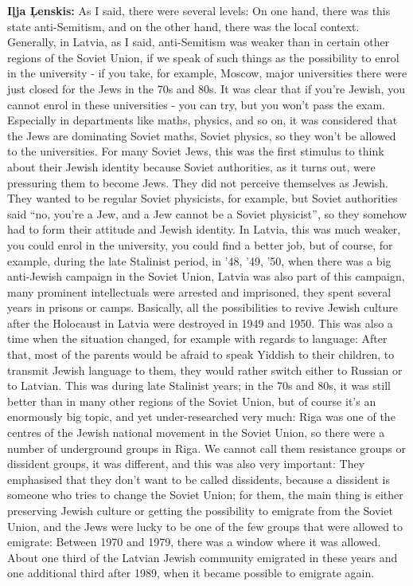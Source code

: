 \textbf{Iļja Ļenskis:} As I said, there were several levels: On one hand, there was this state anti-Semitism, and on the other hand, there was the local context. Generally, in Latvia, as I said, anti-Semitism was weaker than in certain other regions of the Soviet Union, if we speak of such things as the possibility to enrol in the university - if you take, for example, Moscow, major universities there were just closed for the Jews in the 70s and 80s. It was clear that if you’re Jewish, you cannot enrol in these universities - you can try, but you won’t pass the exam. Especially in departments like maths, physics, and so on, it was considered that the Jews are dominating Soviet maths, Soviet physics, so they won't be allowed to the universities. For many Soviet Jews, this was the first stimulus to think about their Jewish identity because Soviet authorities, as it turns out, were pressuring them to become Jews. They did not perceive themselves as Jewish. They wanted to be regular Soviet physicists, for example, but Soviet authorities said ``no, you’re a Jew, and a Jew cannot be a Soviet physicist'', so they somehow had to form their attitude and Jewish identity. In Latvia, this was much weaker, you could enrol in the university, you could find a better job, but of course, for example, during the late Stalinist period, in '48, '49, '50, when there was a big anti-Jewish campaign in the Soviet Union, Latvia was also part of this campaign, many prominent intellectuals were arrested and imprisoned, they spent several years in prisons or camps. Basically, all the possibilities to revive  Jewish culture after the Holocaust in Latvia were destroyed in 1949 and 1950. This was also a time when the situation changed, for example with regards to language: After that, most of the parents would be afraid to speak Yiddish to their children, to transmit Jewish language to them, they would rather switch either to Russian or to Latvian. This was during late Stalinist years; in the 70s and 80s, it was still better than in many other regions of the Soviet Union, but of course it’s an enormously big topic, and yet under-researched very much: Riga was one of the centres of the Jewish national movement in the Soviet Union, so there were a number of underground groups in Riga. We cannot call them resistance groups or dissident groups, it was different, and this was also very important: They emphasised that they don’t want to be called dissidents, because a dissident is someone who tries to change the Soviet Union; for them, the main thing is either preserving Jewish culture or getting the possibility to emigrate from the Soviet Union, and the Jews were lucky to be one of the few groups that were allowed to emigrate: Between 1970 and 1979, there was a window where it was allowed. About one third of the Latvian Jewish community emigrated in these years and one additional third after 1989, when it became possible to emigrate again. 

